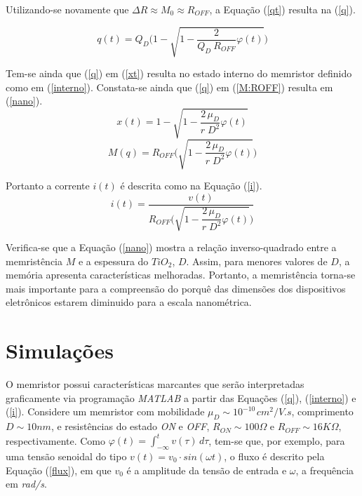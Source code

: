 \documentclass{ceel}
\begin{document}
\begin{multicols}{2}
Utilizando-se novamente que $\Delta R \approx M_0 \approx R_{OFF}$, a Equação (\ref{qt}) resulta na (\ref{q}). 
\vspace{0.05cm}

\begin{equation}\label{q}
q(t)=Q_D\Bigg(1-\sqrt{1-\dfrac{2}{Q_D\ R_{OFF}}\varphi(t)}\Bigg)
\end{equation} 
\vspace{0.05cm}

Tem-se ainda que (\ref{q}) em (\ref{xt}) resulta no estado interno do memristor definido como em (\ref{interno}). Constata-se ainda que (\ref{q}) em (\ref{M:ROFF}) resulta em (\ref{nano}).
\begin{equation}\label{interno}
x(t)=1-\sqrt{1-\dfrac{2\, \mu_D}{r\; D^2}\varphi(t)}
\end{equation} 
\begin{equation}\label{nano}
M(q)=R_{OFF}\Bigg(\sqrt{1-\dfrac{2\, \mu_D}{r\; D^2}\varphi(t) }\Bigg)
\end{equation}
\vspace{0.05cm}

Portanto a corrente $i(t)$ é descrita como na Equação (\ref{i}).
\begin{equation}\label{i}
i(t)=\dfrac{v(t)}{R_{OFF}\Bigg(\sqrt{1-\dfrac{2\, \mu_D}{r\; D^2}\varphi(t) }\Bigg)}
\end{equation} 

Verifica-se que a Equação (\ref{nano}) mostra a relação inverso-quadrado entre a memristência $M$ e a espessura do $TiO_2$, $D$. Assim, para menores valores de $D$, a memória apresenta características melhoradas. Portanto, a memristência torna-se mais importante para a compreensão do porquê das dimensões dos dispositivos eletrônicos estarem diminuido para a escala nanométrica.

\section{Simulações} \label{sim}
O memristor possui características marcantes que serão interpretadas graficamente via programação \emph{MATLAB} a partir das Equações (\ref{q}), (\ref{interno}) e (\ref{i}). Considere um memristor com mobilidade $\mu_D \sim 10^{-10\,} cm^2/V.s$, comprimento $D\sim10nm$, e resistências do estado \textit{ON} e \textit{OFF}, $R_{ON}\sim 100\Omega$ e $R_{OFF}\sim 16K\Omega$, respectivamente. Como $\varphi(t)=\int_{-\infty}^t v(\tau)\, d\tau$, tem-se que, por exemplo, para uma tensão senoidal do tipo $v(t)=v_0\cdot sin(\omega t)$, o fluxo é descrito pela Equação (\ref{flux}), em que $v_0$ é a amplitude da tensão de entrada e $\omega$, a frequência em \textit{rad/s}.


\end{multicols}
\end{document}
